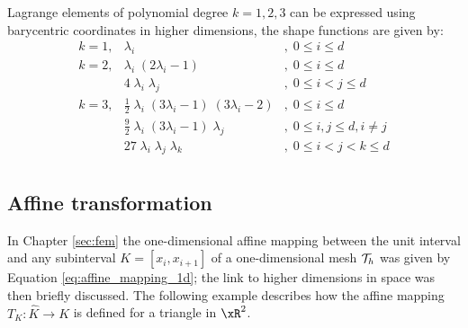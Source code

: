 Lagrange elements of polynomial degree $k=1,2,3$ can be expressed using barycentric coordinates in higher dimensions, the shape functions are given by:
\begin{equation*}
\begin{array}{lll}
k = 1, & \displaystyle\lambda_i &,\;0 \leq i \leq d\\[4ex]
k = 2, & \displaystyle\lambda_i\;(2 \lambda_i - 1) & ,\;0 \leq i \leq d\\[2ex]
       & \displaystyle4\;\lambda_i\;\lambda_j       & ,\;0 \leq i < j \leq d\\[4ex]
k = 3, & \displaystyle\frac{1}{2}\;\lambda_i\;(3\lambda_i - 1)\;(3 \lambda_i - 2) & ,\;0 \leq i \leq d\\[2ex]
       & \displaystyle\frac{9}{2}\;\lambda_i\;(3\lambda_i - 1)\;\lambda_j & ,\;0 \leq i,j \leq d, i \neq j\\[2ex]
       & \displaystyle27\;\lambda_i\;\lambda_j\;\lambda_k & ,\;0 \leq i < j < k \leq d\\
\end{array}
\end{equation*}

\subsection{Affine transformation}

In Chapter \ref{sec:fem} the one-dimensional affine mapping between the unit interval and any subinterval $K = [x_{i}, x_{i+1}]$ of a one-dimensional mesh ${\mathcal T}_h$ was given by Equation \eqref{eq:affine_mapping_1d}; the link to higher dimensions in space was then briefly discussed.
The following example describes how the affine mapping $T_K : \hat K \rightarrow K$ is defined for a triangle in $\xR^2$.

\begin{figure}[h!]\label{fig:affine_mapping_2d}
\centering
{}
\end{figure}

